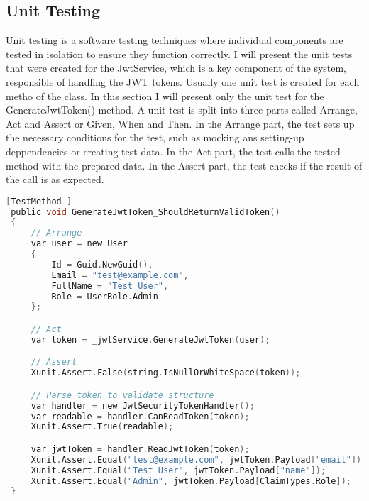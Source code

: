 \subsection{Unit Testing}
Unit testing is a software testing techniques where individual components are tested in isolation to ensure they function correctly.
I will present the unit tests that were created for the JwtService, which is a key component of the system, responsible of handling the JWT tokens.
Usually one unit test is created for each metho of the class. In this section I will present only the unit test for the GenerateJwtToken()
method. A unit test is split into three parts called Arrange, Act and Assert or Given, When and Then. In the Arrange part, the test
sets up the necessary conditions for the test, such as mocking ans setting-up deppendencies or creating test data. In the Act part, the test
calls the tested method with the prepared data. In the Assert part, the test checks if the result of the call is as expected.
\begin{lstlisting}[language=C, caption={Unit Test for GenerateJwtToken() Method in JwtService}, label={lst:jwt_unit_test}]
 [TestMethod ]
 public void GenerateJwtToken_ShouldReturnValidToken()
 {
     // Arrange
     var user = new User
     {
         Id = Guid.NewGuid(),
         Email = "test@example.com",
         FullName = "Test User",
         Role = UserRole.Admin
     };

     // Act
     var token = _jwtService.GenerateJwtToken(user);

     // Assert
     Xunit.Assert.False(string.IsNullOrWhiteSpace(token));

     // Parse token to validate structure
     var handler = new JwtSecurityTokenHandler();
     var readable = handler.CanReadToken(token);
     Xunit.Assert.True(readable);

     var jwtToken = handler.ReadJwtToken(token);
     Xunit.Assert.Equal("test@example.com", jwtToken.Payload["email"]);
     Xunit.Assert.Equal("Test User", jwtToken.Payload["name"]);
     Xunit.Assert.Equal("Admin", jwtToken.Payload[ClaimTypes.Role]);
 }
\end{lstlisting}

